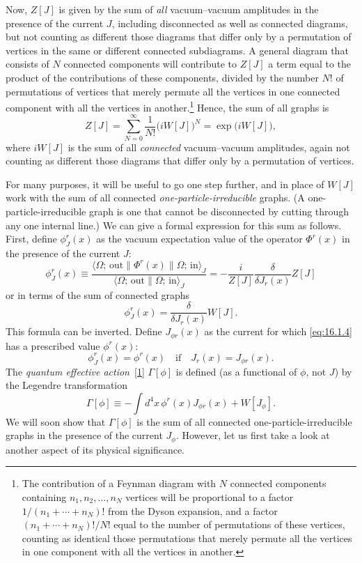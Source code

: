 Now, $Z[J]$ is given by the sum of \emph{all} vacuum--vacuum amplitudes in
the presence of the current $J$, including disconnected as well as connected
diagrams, but not counting as different those diagrams that differ only
by a permutation of vertices in the same or different connected subdiagrams.
A general diagram that consists of $N$ connected components will
contribute to $Z[J]$ a term equal to the product of the contributions of
these components, divided by the number $N!$ of permutations of vertices
that merely permute all the vertices in one connected component with all
the vertices in another.\footnote{The contribution of a Feynman diagram with $N$ connected components containing
$n_1,n_2,\ldots,n_N$ vertices will be proportional to a factor $1/(n_1+\cdots+n_N)!$ from the Dyson
expansion, and a factor $(n_1+\cdots+n_N)!/N!$ equal to the number of permutations of these
vertices, counting as identical those permutations that merely permute all the vertices
in one component with all the vertices in another.} Hence, the sum of all graphs is
\begin{equation}
Z[J]=\sum_{N=0}^{\infty}\frac{1}{N!}\bigl(iW[J]\bigr)^N
=\exp\bigl(iW[J]\bigr),
\label{eq:16.1.3}
\end{equation}
where $iW[J]$ is the sum of all \emph{connected} vacuum--vacuum amplitudes, again
not counting as different those diagrams that differ only by a permutation
of vertices.

For many purposes, it will be useful to go one step further, and in place
of $W[J]$ work with the sum of all connected \emph{one-particle-irreducible} graphs.
(A one-particle-irreducible graph is one that cannot be disconnected by
cutting through any one internal line.) We can give a formal expression
for this sum as follows. First, define $\phi_J^r(x)$ as the vacuum expectation
value of the operator $\Phi^r(x)$ in the presence of the current $J$:
\begin{equation}
\phi_J^r(x)\equiv
\frac{\langle \Omega;\,\mathrm{out}\|\Phi^r(x)\|\Omega;\,\mathrm{in}\rangle_J}
{\langle \Omega;\,\mathrm{out}\|\Omega;\,\mathrm{in}\rangle_J}
=-\frac{i}{Z[J]}\frac{\delta}{\delta J_r(x)}Z[J]
\label{eq:16.1.4}
\end{equation}
or in terms of the sum of connected graphs
\begin{equation}
\phi_J^r(x)=\frac{\delta}{\delta J_r(x)}W[J].
\label{eq:16.1.5}
\end{equation}
This formula can be inverted. Define $J_{\phi r}(x)$ as the current for which
\eqref{eq:16.1.4} has a prescribed value $\phi^r(x)$:
\[
\phi_J^r(x)=\phi^r(x)\quad\text{if}\quad J_r(x)=J_{\phi r}(x).
\]
The \emph{quantum effective action}~\hyperref[ch16-ref-1]{[1]} $\Gamma[\phi]$ is defined (as a functional of $\phi$, not $J$)
by the Legendre transformation
\begin{equation}
\Gamma[\phi]\equiv-\int d^4x\,\phi^r(x)J_{\phi r}(x)+W[J_\phi].
\label{eq:16.1.6}
\end{equation}
We will soon show that $\Gamma[\phi]$ is the sum of all connected
one-particle-irreducible graphs in the presence of the current $J_\phi$. However, let us first
take a look at another aspect of its physical significance.

